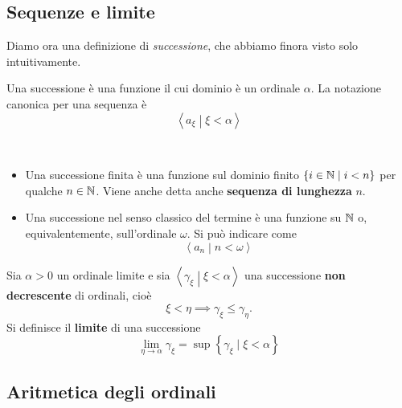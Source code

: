 \subsection{Sequenze e limite}
Diamo ora una definizione di \textit{successione}, che abbiamo finora visto solo intuitivamente.
\begin{define}[Successione]
	Una successione è una funzione il cui dominio è un ordinale $\alpha$. La notazione canonica per una sequenza è
	\begin{equation*}
		\left<a_\xi\middle|\xi<\alpha\right>
	\end{equation*}
\end{define}
\begin{examples}~
	\begin{itemize}
		\item Una successione finita è una funzione sul dominio finito $\left\{i\in\mathbb{N}\mid i<n\right\}$ per qualche $n\in\mathbb{N}$. Viene anche detta anche \textbf{sequenza di lunghezza} $n$.
		\item Una successione nel senso classico del termine è una funzione su $\mathbb{N}$ o, equivalentemente, sull'ordinale $\omega$. Si può indicare come
			\begin{equation*}
			\left<a_n\middle|n<\omega\right>
		\end{equation*}
	\end{itemize}
\end{examples}
\begin{define}
	Sia $\alpha>0$ un ordinale limite e sia $\left<\gamma_\xi\middle|\xi<\alpha\right>$ una successione \textbf{non decrescente} di ordinali, cioè
	\begin{equation*}
		\xi <\eta \implies \gamma_\xi\leq \gamma_\eta.
	\end{equation*}
	Si definisce il \textbf{limite} di una successione
	\begin{equation}
		\lim_{\eta\to \alpha}\gamma_\xi=\sup\left\{\gamma_\xi\mid\xi<\alpha\right\}
	\end{equation}
\end{define}
\subsection{Aritmetica degli ordinali}
